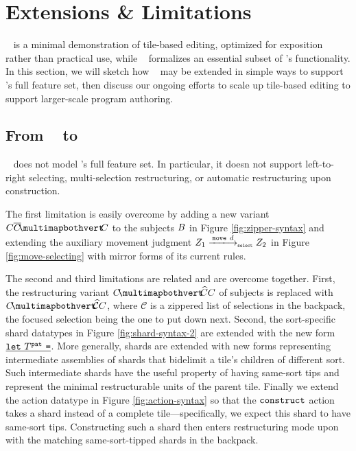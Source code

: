 \section{Extensions \& Limitations}

\tylr~ is a minimal demonstration of tile-based
editing, optimized for exposition rather than practical use,
while \ty~ formalizes an essential subset of \tylr's functionality.
In this section, we will sketch how \ty~ may be extended
in simple ways to support \tylr's full feature set,
then discuss our ongoing efforts to scale up tile-based
editing to support larger-scale program authoring.

\subsection{From \ty~ to \tylr}

\ty~ does not model \tylr's full feature set.
In particular, it doesn not support left-to-right selecting,
multi-selection restructuring, or automatic restructuring
upon construction.

The first limitation is easily overcome by adding
a new variant $\selectingRight{\selection}{\selection}{\selection}$
to the subjects $B$ in Figure \ref{fig:zipper-syntax}
and extending the auxiliary movement judgment
$\smove{\editState_1}{\direction}{\editState_2}$
in Figure \ref{fig:move-selecting}
with mirror forms of its current rules.

The second and third limitations are related
and are overcome together.
First, the restructuring variant $\restructuring{\selection}{\selection}{\selection}$
of subjects is replaced with $\restructuring{\selection}{\mathcal{C}}\selection$,
where $\mathcal{C}$ is a zippered list of selections in the backpack,
the focused selection being the one to put down next.
Second, the sort-specific shard datatypes in Figure \ref{fig:shard-syntax-2}
are extended with
the new form $\underline{\texttt{let}~T^{\texttt{pat}}~\texttt{=}}$.
More generally, shards are extended with new forms
representing intermediate assemblies of shards that
bidelimit a tile's children of different sort.
Such intermediate shards have the useful property of having same-sort
tips and represent the minimal restructurable units of the
parent tile.
Finally we extend the action datatype in Figure \ref{fig:action-syntax}
so that the $\texttt{construct}$ action takes a shard instead of
a complete tile---specifically, we expect this shard to have same-sort tips.
Constructing such a shard then enters restructuring mode
upon with the matching same-sort-tipped shards in the backpack.


